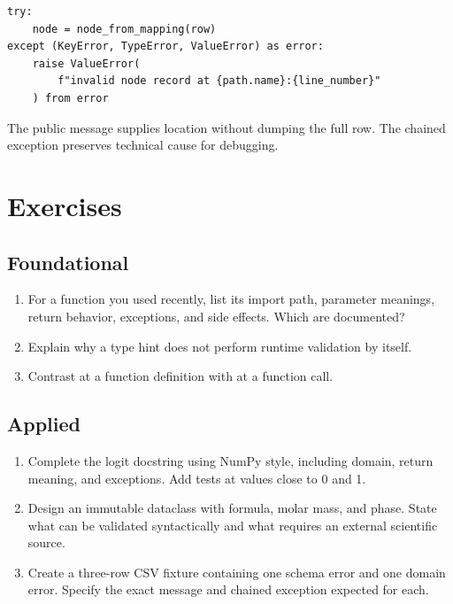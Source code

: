 \begin{lstlisting}
try:
    node = node_from_mapping(row)
except (KeyError, TypeError, ValueError) as error:
    raise ValueError(
        f"invalid node record at {path.name}:{line_number}"
    ) from error
\end{lstlisting}

The public message supplies location without dumping the full row. The chained
exception preserves technical cause for debugging.


\section{Exercises}

\subsection*{Foundational}
\begin{enumerate}
  \item For a function you used recently, list its import path, parameter
  meanings, return behavior, exceptions, and side effects. Which are documented?
  \item Explain why a type hint does not perform runtime validation by itself.
  \item Contrast  at a function definition with  at a
  function call.
\end{enumerate}

\subsection*{Applied}
\begin{enumerate}
  \item Complete the logit docstring using NumPy style, including domain,
  return meaning, and exceptions. Add tests at values close to 0 and 1.
  \item Design an immutable  dataclass with formula,
  molar mass, and phase. State what can be validated syntactically and what
  requires an external scientific source.
  \item Create a three-row CSV fixture containing one schema error and one
  domain error. Specify the exact message and chained exception expected for
  each.
\end{enumerate}

